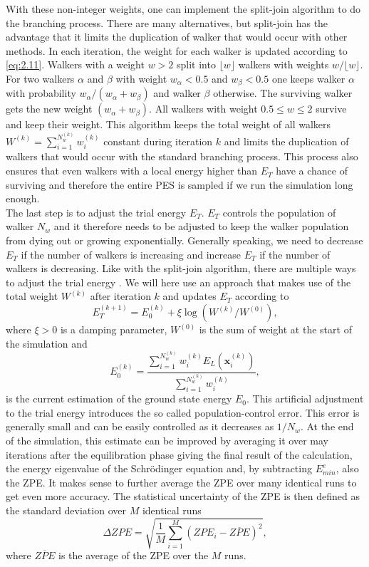 \documentclass [12pt]{report}
\begin{document}
With these non-integer weights, one can implement the split-join algorithm \cite{split_join} to do the branching process. There are many alternatives, but split-join has the advantage that it limits the duplication of walker that would occur with other methods.
 In each iteration, the weight for each walker is updated according to \eqref{eq:2.11}. Walkers with a weight $w > 2$ split into $\lfloor w \rfloor$ walkers with weights $w/\lfloor w \rfloor$. For two walkers $\alpha$ and $\beta$ with weight $w_\alpha < 0.5$ and $w_\beta < 0.5$ one keeps walker $\alpha$  with probability $w_\alpha/(w_\alpha + w_\beta)$ and walker $\beta$ otherwise. The surviving walker gets the new weight $(w_\alpha + w_\beta)$. All walkers with weight $0.5 \leq w \leq 2$ survive and keep their weight. This algorithm keeps the total weight of all walkers $W^{(k)} =  \sum_{i = 1}^{N_w^{(k)}} w_i^{(k)}$ constant during iteration $k$ and limits the duplication of walkers that would occur with the standard branching process.
 This process also ensures that even walkers with a local energy higher than $E_T$ have a chance of surviving and therefore the entire PES is sampled if we run the simulation long enough. \\
The last step is to adjust the trial energy $E_T$. $E_T$ controls the population of walker $N_w$ and it therefore needs to be adjusted to keep the walker population from dying out or growing exponentially. Generally speaking, we need to decrease $E_T$ if the number of walkers is increasing and increase $E_T$ if the number of walkers is decreasing.  Like with the split-join algorithm, there are multiple ways to adjust the trial energy \cite{mccoy,alavi}. We will here use an approach \cite{cyrus} that makes use of the total weight $W^{(k)}$ after iteration $k$ and updates $E_T$ according to
\begin{equation}\label{eq:2.12} 
E_T^{(k+1)} = E_0^{(k)} + \xi \log(W^{(k)}/W^{(0)}),
\end{equation}
where $\xi > 0$ is a damping parameter, $W^{(0)}$ is the sum of weight at the start of the simulation and
\begin{equation}\label{eq:2.13} 
E_0^{(k)} = \frac{\sum_{i = 1}^{N_w^{(k)}} w_{i}^{(k)} E_L(\bm{x}_{i}^{(k)})}{\sum_{i = 1}^{N_w^{(k)}} w_{i}^{(k)} },
\end{equation}
is the current estimation of the ground state energy $E_0$. This artificial adjustment to the trial energy introduces the so called population-control error. This error is generally small and can be easily controlled as it decreases as $1/N_{w}$. At the end of the simulation, this estimate can be improved by averaging it over may iterations after the equilibration phase giving the final result of the calculation, the energy eigenvalue of the Schrödinger equation and, by subtracting $E^e_{min}$, also the ZPE. It makes sense to further average the ZPE over many identical runs to get even more accuracy. The statistical uncertainty of the ZPE is then defined as the standard deviation over $M$ identical runs \cite{herleitung2}
\begin{equation}
\Delta ZPE = \sqrt{\frac{1}{M} \sum_{i=1}^M(ZPE_i - \overline{ZPE})^2},
\end{equation}
where $\overline{ZPE}$ is the average of the ZPE over the $M$ runs.
\newpage
\end{document}

